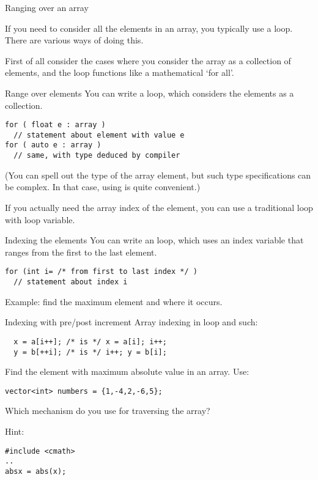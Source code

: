  {Ranging over an array}
\label{sec:arrayrange}

If you need to consider all the elements in an array, you typically
use a  loop. There are various ways of doing this.

First of all consider the cases where you consider the array as a
collection of elements, and the loop functions like a mathematical
`for all'.

\begin{block}{Range over elements}
  \label{sl:array-range}
  You can write a  loop, which
  considers the elements as a collection.
\begin{verbatim}
for ( float e : array )
  // statement about element with value e
for ( auto e : array )
  // same, with type deduced by compiler
\end{verbatim}

\end{block}

(You can spell out the type of the array element, but such type
specifications can be complex. In that case, using  is
quite convenient.)

If you actually need the array index of the element, you can use a
traditional  loop with loop variable.

\begin{block}{Indexing the elements}
  \label{sl:index-range}
  You can write an  loop, which uses an
  index variable that ranges from the first to the last element.
\begin{verbatim}
for (int i= /* from first to last index */ )
  // statement about index i
\end{verbatim}
Example: find the maximum element and where it occurs.
%
\end{block}

\begin{block}{Indexing with pre/post increment}
  \label{sl:prepostindex}
Array indexing in  loop and such:
\begin{verbatim}
  x = a[i++]; /* is */ x = a[i]; i++;
  y = b[++i]; /* is */ i++; y = b[i];
\end{verbatim}
\end{block}

\begin{exercise}
  \label{ex:array-max}
  Find the element with maximum absolute value in an array. Use:
\begin{verbatim}
vector<int> numbers = {1,-4,2,-6,5};
\end{verbatim}
Which mechanism do you use for traversing the array?

Hint:
\begin{verbatim}
#include <cmath>
..
absx = abs(x);
\end{verbatim}
\end{exercise}

